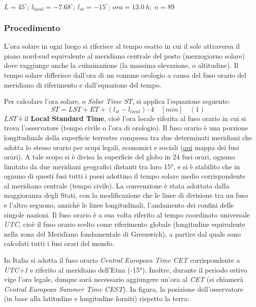 \documentclass[11pt]{article}
\begin{document}
    \(L = 45^{\circ};\ l_{local} = -7.68^{\circ};\ l_{st} = -15^{\circ};\ ora = 13.0 \ h;\  n = 89\)

    

    \hypertarget{procedimento}{%
\subsubsection{Procedimento}\label{procedimento}}

L'ora solare in ogni luogo si riferisce al tempo esatto in cui il sole
attraversa il piano nord-sud equivalente al meridiano centrale del posto
(mezzogiorno solare) dove raggiunge anche la culminazione (la massima
elevazione, o altitudine). Il tempo solare differisce dall'ora di un
comune orologio a causa del fuso orario del meridiano di riferimento e
dall'equazione del tempo.

Per calcolare l'ora solare, o \emph{Solar Time} \(ST\), si applica
l'equazione seguente:
\[ST = LST + ET + (l_{st}-l_{local})\cdot4 \quad [min] \quad (1)\]
\(LST\) è il \textbf{Local Standard Time}, cioè l'ora locale riferita al
fuso orario in cui si trova l'osservatore (tempo civile o l'ora di
orologio). Il fuso orario è una porzione longitudinale della superficie
terrestre compresa tra due determinati meridiani che adotta lo stesso
orario per scopi legali, economici e sociali
(\href{https://it.wikipedia.org/wiki/Fuso_orario\#/media/File:World_Time_Zones_Map.png}{qui}
mappa dei fusi orari). A tale scopo si è divisa la superficie del globo
in 24 fusi orari, ognuno limitato da due meridiani geografici distanti
tra loro 15°, e si è stabilito che in ognuno di questi fusi tutti i
paesi adottino il tempo solare medio corrispondente al meridiano
centrale (tempo civile). La convenzione è stata adottata dalla
maggioranza degli Stati, con la modificazione che le linee di divisione
tra un fuso e l'altro seguono, anziché le linee longitudinali,
l'andamento dei confini delle singole nazioni. Il fuso orario è a sua
volta riferito al tempo coordinato universale \emph{UTC}, cioè il fuso
orario scelto come riferimento globale (longitudine equivalente nella
zona del Meridiano fondamentale di Greenwich), a partire dal quale sono
calcolati tutti i fusi orari del mondo.

    In Italia si adotta il fuso orario \emph{Central European Time CET}
corrispondente a \emph{UTC+1} e riferito al meridiano dell'Etna (-15°).
Inoltre, durante il periodo estivo vige l'ora legale, dunque sarà
necessario aggiungere un'ora al \emph{CET} (si chiamerà \emph{Central
European Summer Time CEST}). In figura, la posizione dell'osservatore
(in base alla latitudine e longitudine forniti) rispetto la terra:
 
\end{document}
